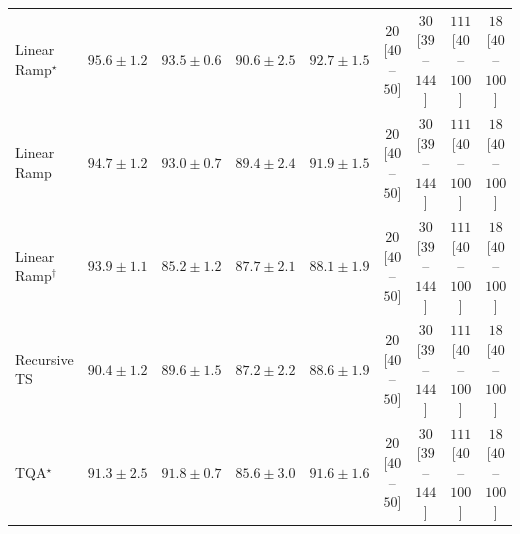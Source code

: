 \begin{tabular}{l|cccc|cccc|}
Linear Ramp$^\star$ & {\cellcolor[HTML]{006435}} \color[HTML]{F1F1F1} $95.6\pm 1.2$ & {\cellcolor[HTML]{11753D}} \color[HTML]{F1F1F1} $93.5\pm 0.6$ & {\cellcolor[HTML]{2D914B}} \color[HTML]{F1F1F1} $90.6\pm 2.5$ & {\cellcolor[HTML]{197C40}} \color[HTML]{F1F1F1} $92.7\pm 1.5$ & {\cellcolor[HTML]{FDE4E1}} \color[HTML]{000000} $20$ [$40$--$50$] & {\cellcolor[HTML]{FDD9D6}} \color[HTML]{000000} $30$ [$39$--$144$] & {\cellcolor[HTML]{E23E99}} \color[HTML]{F1F1F1} $111$ [$40$--$100$] & {\cellcolor[HTML]{FEE6E3}} \color[HTML]{000000} $18$ [$40$--$100$] \\
Linear Ramp & {\cellcolor[HTML]{056C39}} \color[HTML]{F1F1F1} $94.7\pm 1.2$ & {\cellcolor[HTML]{167A3F}} \color[HTML]{F1F1F1} $93.0\pm 0.7$ & {\cellcolor[HTML]{379E54}} \color[HTML]{F1F1F1} $89.4\pm 2.4$ & {\cellcolor[HTML]{218242}} \color[HTML]{F1F1F1} $91.9\pm 1.5$ & {\cellcolor[HTML]{FDE4E1}} \color[HTML]{000000} $20$ [$40$--$50$] & {\cellcolor[HTML]{FDD9D6}} \color[HTML]{000000} $30$ [$39$--$144$] & {\cellcolor[HTML]{E23E99}} \color[HTML]{F1F1F1} $111$ [$40$--$100$] & {\cellcolor[HTML]{FEE6E3}} \color[HTML]{000000} $18$ [$40$--$100$] \\
Linear Ramp$^\dagger$ & {\cellcolor[HTML]{0D733C}} \color[HTML]{F1F1F1} $93.9\pm 1.1$ & {\cellcolor[HTML]{70C275}} \color[HTML]{000000} $85.2\pm 1.2$ & {\cellcolor[HTML]{49AF61}} \color[HTML]{F1F1F1} $87.7\pm 2.1$ & {\cellcolor[HTML]{43AC5E}} \color[HTML]{F1F1F1} $88.1\pm 1.9$ & {\cellcolor[HTML]{FDE4E1}} \color[HTML]{000000} $20$ [$40$--$50$] & {\cellcolor[HTML]{FDD9D6}} \color[HTML]{000000} $30$ [$39$--$144$] & {\cellcolor[HTML]{E23E99}} \color[HTML]{F1F1F1} $111$ [$40$--$100$] & {\cellcolor[HTML]{FEE6E3}} \color[HTML]{000000} $18$ [$40$--$100$] \\
Recursive TS & {\cellcolor[HTML]{2F934D}} \color[HTML]{F1F1F1} $90.4\pm 1.2$ & {\cellcolor[HTML]{359C53}} \color[HTML]{F1F1F1} $89.6\pm 1.5$ & {\cellcolor[HTML]{51B365}} \color[HTML]{F1F1F1} $87.2\pm 2.2$ & {\cellcolor[HTML]{3EA75A}} \color[HTML]{F1F1F1} $88.6\pm 1.9$ & {\cellcolor[HTML]{FDE4E1}} \color[HTML]{000000} $20$ [$40$--$50$] & {\cellcolor[HTML]{FDD9D6}} \color[HTML]{000000} $30$ [$39$--$144$] & {\cellcolor[HTML]{E23E99}} \color[HTML]{F1F1F1} $111$ [$40$--$100$] & {\cellcolor[HTML]{FEE6E3}} \color[HTML]{000000} $18$ [$40$--$100$] \\
TQA$^\star$ & {\cellcolor[HTML]{268846}} \color[HTML]{F1F1F1} $91.3\pm 2.5$ & {\cellcolor[HTML]{228343}} \color[HTML]{F1F1F1} $91.8\pm 0.7$ & {\cellcolor[HTML]{6BC072}} \color[HTML]{000000} $85.6\pm 3.0$ & {\cellcolor[HTML]{248644}} \color[HTML]{F1F1F1} $91.6\pm 1.6$ & {\cellcolor[HTML]{FDE4E1}} \color[HTML]{000000} $20$ [$40$--$50$] & {\cellcolor[HTML]{FDD9D6}} \color[HTML]{000000} $30$ [$39$--$144$] & {\cellcolor[HTML]{E23E99}} \color[HTML]{F1F1F1} $111$ [$40$--$100$] & {\cellcolor[HTML]{FEE6E3}} \color[HTML]{000000} $18$ [$40$--$100$] \\

\end{tabular}
